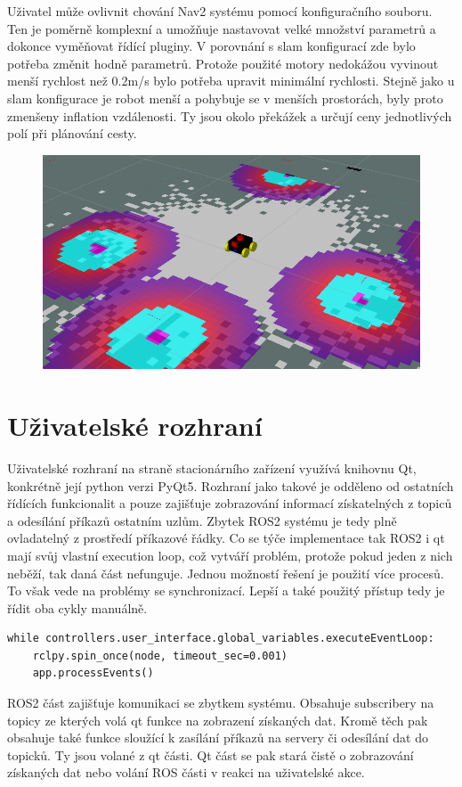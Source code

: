 Uživatel může ovlivnit chování Nav2 systému pomocí konfiguračního souboru. Ten je poměrně komplexní a umožňuje nastavovat velké množství parametrů a dokonce vyměňovat řídící pluginy. V porovnání s slam konfigurací zde bylo potřeba změnit hodně parametrů. Protože použité motory nedokážou vyvinout menší rychlost než 0.2m/s bylo potřeba upravit minimální rychlosti. Stejně jako u slam konfigurace je robot menší a pohybuje se v menších prostorách, byly proto zmenšeny inflation vzdálenosti. Ty jsou okolo překážek a určují ceny jednotlivých polí při plánování cesty.

\begin{figure}[h!]
	\centering
	\includegraphics[scale=0.4]{obrazky-figures/nav2.png}
	\caption{}
	\label{}
\end{figure}

\section{Uživatelské rozhraní}
Uživatelské rozhraní na straně stacionárního zařízení využívá knihovnu Qt, konkrétně její python verzi PyQt5. Rozhraní jako takové je odděleno od ostatních řídících funkcionalit a pouze zajišťuje zobrazování informací získatelných z topiců a odesílání příkazů ostatním uzlům. Zbytek ROS2 systému je tedy plně ovladatelný z prostředí příkazové řádky. Co se týče implementace tak ROS2 i qt mají svůj vlastní execution loop, což vytváří problém, protože pokud jeden z nich neběží, tak daná část nefunguje. Jednou možností řešení je použití více procesů. To však vede na problémy se synchronizací. Lepší a také použitý přístup tedy je řídit oba cykly manuálně. 
\begin{verbatim}
while controllers.user_interface.global_variables.executeEventLoop:
	rclpy.spin_once(node, timeout_sec=0.001)
	app.processEvents()
\end{verbatim}
ROS2 část zajišťuje komunikaci se zbytkem systému. Obsahuje subscribery na topicy ze kterých volá qt funkce na zobrazení získaných dat. Kromě těch pak obsahuje také funkce sloužící k zasílání příkazů na servery či odesílání dat do topicků. Ty jsou volané z qt části.
Qt část se pak stará čistě o zobrazování získaných dat nebo volání ROS části v reakci na uživatelské akce.

